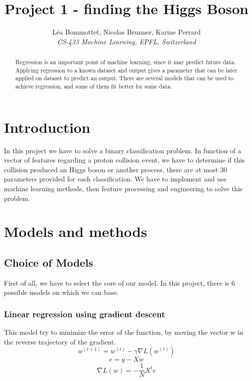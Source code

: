 \documentclass[10pt,conference,compsocconf]{IEEEtran}
\begin{document}
	\title{Project 1 - finding the Higgs Boson}
	
	\author{
		L\'ea Bommottet, Nicolas Brunner, Karine Perrard\\
		\textit{CS-433 Machine Learning, EPFL, Switzerland}
	}
	
	\maketitle
	\begin{abstract}
		Regression is an important point of machine learning, since it may predict future data. Applying regression to a known dataset and output gives a parameter that can be later applied on dataset to predict an output. There are several models that can be used to achieve regression, and some of them fit better for some data.
	\end{abstract}
	\section{Introduction}
	
	In this project we have to solve a binary classification problem. In function of a vector of features regarding a proton collision event, we have to determine if this collision produced an Higgs boson or another process,
	there are at most 30 parameters provided for each classification. We have to implement and use machine learning methods, then feature processing and engineering to solve this problem.
	
	\section{Models and methods}
	
	\subsection{Choice of Models}
	First of all, we have to select the core of our model. In this project, there is 6 possible models on which we can base.
	\subsubsection{Linear regression using gradient descent}
	
	This model try to minimize the error of the function, by moving the vector w in the reverse trajectory of the gradient.
	$$w^{(t+1)}=w^{(t)} -\gamma \nabla L(w^{(t)})$$
	$$e = y-Xw$$
	$$\nabla L(w) = -\frac{1}{N}X^te$$
	
\end{document}
